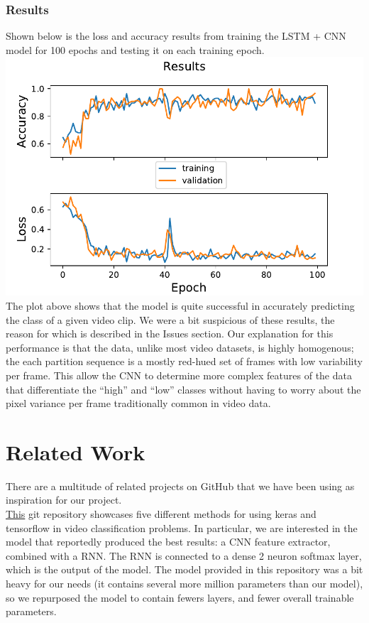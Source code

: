 \documentclass{article}
\begin{document}
{\subsubsection*{Results}{
Shown below is the loss and accuracy results from training the LSTM + CNN model for 100 epochs and testing it on each training epoch. \\
\includegraphics{../figs/midway_results.pdf} \\
The plot above shows that the model is quite successful in accurately predicting the class of a given video clip. We were a bit suspicious of these results, the reason for which is described in the Issues section. Our explanation for this performance is that the data, unlike most video datasets, is highly homogenous; the each partition sequence is a mostly red-hued set of frames with low variability per frame. This allow the CNN to determine more complex features of the data that differentiate the ``high'' and ``low'' classes without having to worry about the pixel variance per frame traditionally common in video data.
}}
\section*{Related Work}{There are a multitude of related projects on GitHub that we have been using as inspiration for our project. \\

\noindent \href{https://github.com/harvitronix/five-video-classification-methods/blob/master/train_cnn.py}{This} git repository showcases five different methods for using keras and tensorflow in video classification problems. In particular, we are interested in the model that reportedly produced the best results: a CNN feature extractor, combined with a RNN. The RNN is connected to a dense 2 neuron softmax layer, which is the output of the model. The model provided in this repository was a bit heavy for our needs (it contains several more million parameters than our model), so we repurposed the model to contain fewers layers, and fewer overall trainable parameters. \\ }
\newpage
\end{document}
